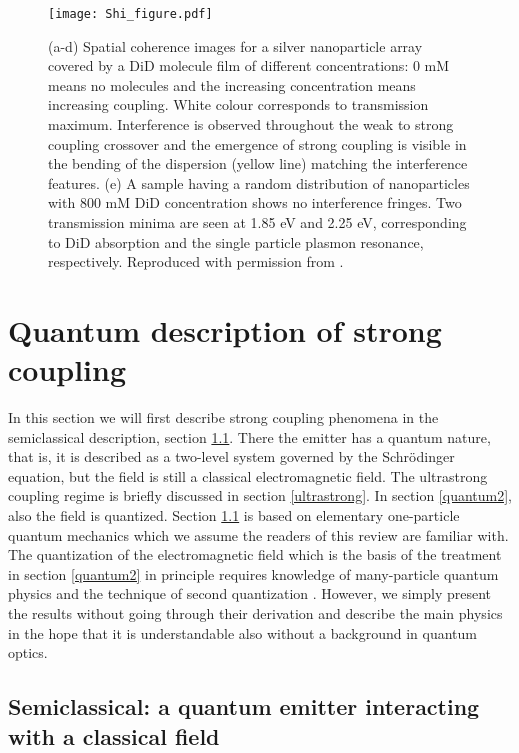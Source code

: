 \documentclass[12pt]{iopart}
\begin{document}
\begin{figure}
\texttt{[image: Shi\_figure.pdf]}
\caption{(a-d) Spatial coherence images for a silver nanoparticle array covered by a DiD molecule film of different concentrations: 0 mM means no molecules and the increasing concentration means increasing coupling. White colour corresponds to transmission maximum. Interference is observed throughout the weak to strong coupling crossover and the emergence of strong coupling is visible in the bending of the dispersion (yellow line) matching the interference features. (e) A sample having a random distribution of nanoparticles with 800 mM DiD concentration shows no interference fringes. Two transmission minima are seen at 1.85 eV and 2.25 eV, corresponding to DiD absorption and the single particle plasmon resonance, respectively. Reproduced with permission from \cite{Shi2014}.} 
\label{ShiFigure}
\end{figure}


\section{Quantum description of strong coupling} \label{quantum}

In this section we will first describe strong coupling phenomena in the semiclassical description, section \ref{semiclassical}. There the emitter has a quantum nature, that is, it is described as a two-level system governed by the Schr\"odinger equation, but the field is still a classical electromagnetic field. The ultrastrong coupling regime is briefly discussed in section \ref{ultrastrong}. 
In section \ref{quantum2}, also the field is quantized. Section \ref{semiclassical} is based on elementary one-particle quantum mechanics which we assume the readers of this review are familiar with. The quantization of the electromagnetic field which is the basis of the treatment in section \ref{quantum2} in principle requires knowledge of many-particle quantum physics and the technique of second quantization \cite{Schwabl00}. However, we simply present the results without going through their derivation and describe the main physics in the hope that it is understandable also without a background in quantum optics.  

\subsection{Semiclassical: a quantum emitter interacting with a classical field} \label{semiclassical}
\end{document}
